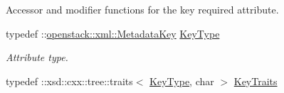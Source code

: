 Accessor and modifier functions for the key required attribute. \begin{DoxyCompactItemize}
\item 
\hypertarget{classopenstack_1_1xml_1_1MetadataItem_a34c4f10408f7374a4b5d593b11bf3424}{
typedef ::\hyperlink{classopenstack_1_1xml_1_1MetadataKey}{openstack::xml::MetadataKey} \hyperlink{classopenstack_1_1xml_1_1MetadataItem_a34c4f10408f7374a4b5d593b11bf3424}{KeyType}}
\label{classopenstack_1_1xml_1_1MetadataItem_a34c4f10408f7374a4b5d593b11bf3424}

\begin{DoxyCompactList}\small\item\em Attribute type. \item\end{DoxyCompactList}\item 
\hypertarget{classopenstack_1_1xml_1_1MetadataItem_a79c7a8d122cbbe6f1bbf550a71e34666}{
typedef ::xsd::cxx::tree::traits$<$ \hyperlink{classopenstack_1_1xml_1_1MetadataKey}{KeyType}, char $>$ \hyperlink{classopenstack_1_1xml_1_1MetadataItem_a79c7a8d122cbbe6f1bbf550a71e34666}{KeyTraits}}
\label{classopenstack_1_1xml_1_1MetadataItem_a79c7a8d122cbbe6f1bbf550a71e34666}


\end{DoxyCompactItemize}
